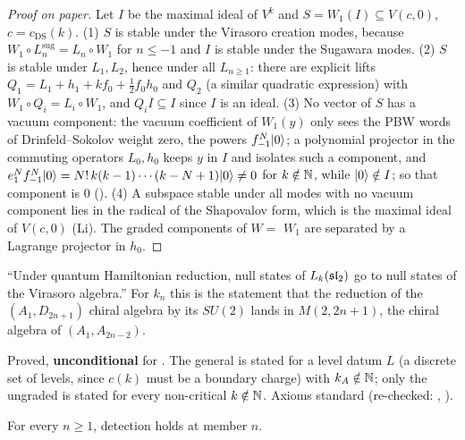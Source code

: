 \begin{proof}[Proof on paper]
Let $I$ be the maximal ideal of $V^k$ and $S=W_1(I)\subseteq V(c,0)$, $c=c_{\mathrm{DS}}(k)$. (1) $S$ is stable under the
Virasoro creation modes, because $W_1\circ L^{\mathrm{sug}}_{n}=L_n\circ W_1$ for $n\le-1$ and $I$ is stable under the
Sugawara modes. (2) $S$ is stable under $L_1,L_2$, hence under all $L_{n\ge1}$: there are explicit lifts
$Q_1=L_1+h_1+kf_0+\frac12f_0h_0$ and $Q_2$ (a similar quadratic expression) with $W_1\circ Q_i=L_i\circ W_1$, and
$Q_iI\subseteq I$ since $I$ is an ideal. (3) No vector of $S$ has a vacuum component: the vacuum coefficient of $W_1(y)$
only sees the PBW words of Drinfeld--Sokolov weight zero, the powers $f_{-1}^N|0\rangle$; a polynomial projector in
the commuting operators $L_0,h_0$ keeps $y$ in $I$ and isolates such a component, and
$e_1^Nf_{-1}^N|0\rangle=N!\,k(k-1)\cdots(k-N+1)|0\rangle\ne0$ for $k\notin{\mathbb{N}}$, while
$|0\rangle\notin I$; so that component is $0$ (). (4) A subspace stable under all modes with no
vacuum component lies in the radical of the Shapovalov form, which is the maximal ideal of $V(c,0)$ (Li). The graded
components of $W=$  $W_1$ are separated by a Lagrange projector in $h_0$.
\end{proof}

\begin{physics}
``Under quantum Hamiltonian reduction, null states of $L_k(\mathfrak{sl}_2)$ go to null states of the Virasoro algebra.''
For $k_n$ this is the statement that the reduction of the $(A_1,D_{2n+1})$ chiral algebra by its $SU(2)$ lands in
$M(2,2n+1)$, the chiral algebra of $(A_1,A_{2n-2})$.
\end{physics}

\begin{status}
Proved, \textbf{unconditional} for . The general  is stated for a
level datum $L$ (a discrete set of levels, since $c(k)$ must be a boundary charge) with $k_A\notin{\mathbb{N}}$; only the ungraded
 is stated for every non-critical $k\notin{\mathbb{N}}$. Axioms standard (re-checked: ,
).
\end{status}

\begin{theorem}\label{l29:thm:detect}
For every $n\ge1$, detection holds at member $n$.
\end{theorem}

